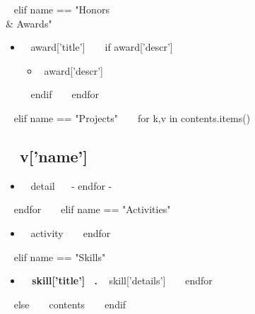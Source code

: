 ~{ elif name == "Honors \\& Awards" }~
  \begin{itemize}
  ~{ for award in contents }~
    \item ~{{ award['title'] }}~
    ~{ if award['descr'] }~
      \begin{itemize}
      \item {~{{award['descr']}}~}
      \end{itemize}
    ~{ endif }~
  ~{ endfor }~
  \end{itemize}
~{ elif name == "Projects" }~
  ~{ for k,v in contents.items() }~
    \subsection{~{{ v['name'] }}~} %
    \begin{itemize}
    ~{ for detail in v['details'] }~
      \item ~{{ detail }}~
    ~{- endfor -}~
    \end{itemize}
  ~{ endfor }~
~{ elif name == "Activities" }~
    \begin{itemize}
  ~{ for activity in contents }~
    \item ~{{ activity }}~
  ~{ endfor }~
    \end{itemize}
~{ elif name == "Skills" }~
    \begin{itemize}
  ~{ for skill in contents }~
    \item { \bf ~{{ skill['title'] }}~. } ~{{ skill['details'] }}~
  ~{ endfor }~
    \end{itemize}
~{ else }~
  ~{{ contents }}~
~{ endif }~
